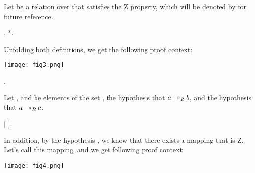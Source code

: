 Let  be a relation over  that satisfies
    the Z property, which will be denoted by  for future
    reference. \begin{coqdoccode}
\coqdocemptyline
\coqdocindent{1.00em}
 ,   *. \end{coqdoccode}
Unfolding both definitions, we get the following
  proof context:


      \texttt{[image: fig3.png]} \begin{coqdoccode}
\coqdocemptyline
\coqdocindent{1.00em}
     . \end{coqdoccode}
Let ,  and  be elements of
     the set ,  the hypothesis that $a \twoheadrightarrow_R b$, and
      the hypothesis that $a\twoheadrightarrow_R c$.  \begin{coqdoccode}
\coqdocemptyline
\coqdocindent{1.00em}
   [ ]. \end{coqdoccode}
In addition, by the hypothesis
     , we know that there exists a mapping  that is
     Z. Let's call  this mapping, and we get following proof
     context:


      \texttt{[image: fig4.png]}


